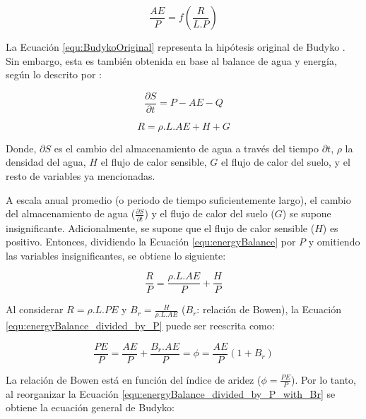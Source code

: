 \documentclass[12pt]{article}
\begin{document}
\begin{equation}
\frac{AE}{P} = f\left ( \frac{R}{L.P} \right ) 
\label{equ:BudykoOriginal}
\end{equation}

La Ecuación \ref{equ:BudykoOriginal} representa la hipótesis original de Budyko \citep{budyko1958heat}. Sin embargo, esta es también obtenida en base al balance de agua y energía, según lo descrito por \citet{arora2002use}:

\begin{equation}
\frac{\partial S}{\partial t} = P - AE - Q
\label{equ:waterBalance}
\end{equation}

\begin{equation}
R  = \rho .L.AE + H + G
\label{equ:energyBalance}
\end{equation}

Donde, $\partial S$ es el cambio del almacenamiento de agua a través del tiempo $\partial t$, $\rho$ la densidad del agua, $H$ el flujo de calor sensible, $G$ el flujo de calor del suelo, y el resto de variables ya mencionadas. 

A escala anual promedio (o periodo de tiempo suficientemente largo), el cambio del almacenamiento de agua ($\frac{\partial S}{\partial t}$) y el flujo de calor del suelo ($G$) se supone insignificante. Adicionalmente, se supone que el flujo de calor sensible ($H$) es positivo. Entonces, dividiendo la Ecuación \ref{equ:energyBalance} por $P$ y omitiendo las variables insignificantes, se obtiene lo siguiente:

\begin{equation}
\frac{R}{P}  = \frac{\rho .L.AE}{P} + \frac{H}{P} \label{equ:energyBalance_divided_by_P}
\end{equation}

Al considerar $R  = \rho .L.PE$ y $B_{r} = \frac{H}{\rho .L.AE}$ ($B_{r}$: relación de Bowen), la Ecuación \ref{equ:energyBalance_divided_by_P} puede ser reescrita como:

\begin{equation}
\frac{PE}{P} = \frac{AE}{P} + \frac{B_{r}.AE}{P} = \phi = \frac{AE}{P}(1 + B_{r})
\label{equ:energyBalance_divided_by_P_with_Br}
\end{equation}

La relación de Bowen está en función del índice de aridez ($\phi = \frac{PE}{P}$). Por lo tanto, al reorganizar la Ecuación \ref{equ:energyBalance_divided_by_P_with_Br} se obtiene la ecuación general de Budyko:
\end{document}
